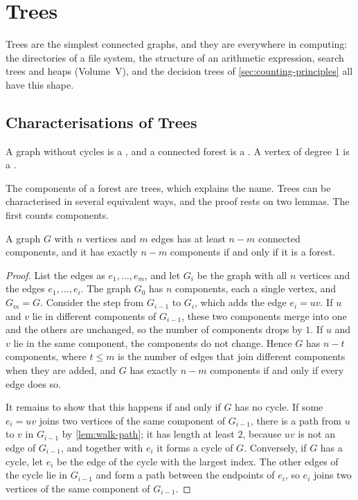 \section{Trees}
\label{sec:trees}

Trees are the simplest connected graphs, and they are everywhere in computing: the directories of a file system, the structure of an arithmetic expression, search trees and heaps (Volume~V), and the decision trees of \cref{sec:counting-principles} all have this shape.

\subsection{Characterisations of Trees}

\begin{definition}
\label{def:tree}
A graph without cycles is a , and a connected forest is a . A vertex of degree $1$ is a .
\end{definition}

The components of a forest are trees, which explains the name. Trees can be characterised in several equivalent ways, and the proof rests on two lemmas. The first counts components.

\begin{lemma}
\label{lem:components-edges}
A graph $G$ with $n$ vertices and $m$ edges has at least $n-m$ connected components, and it has exactly $n-m$ components if and only if it is a forest.
\end{lemma}

\begin{proof}
List the edges as $e_1,\ldots,e_m$, and let $G_i$ be the graph with all $n$ vertices and the edges $e_1,\ldots,e_i$. The graph $G_0$ has $n$ components, each a single vertex, and $G_m=G$. Consider the step from $G_{i-1}$ to $G_i$, which adds the edge $e_i=uv$. If $u$ and $v$ lie in different components of $G_{i-1}$, these two components merge into one and the others are unchanged, so the number of components drops by $1$. If $u$ and $v$ lie in the same component, the components do not change. Hence $G$ has $n-t$ components, where $t\le m$ is the number of edges that join different components when they are added, and $G$ has exactly $n-m$ components if and only if every edge does so.

It remains to show that this happens if and only if $G$ has no cycle. If some $e_i=uv$ joins two vertices of the same component of $G_{i-1}$, there is a path from $u$ to $v$ in $G_{i-1}$ by \cref{lem:walk-path}; it has length at least $2$, because $uv$ is not an edge of $G_{i-1}$, and together with $e_i$ it forms a cycle of $G$. Conversely, if $G$ has a cycle, let $e_i$ be the edge of the cycle with the largest index. The other edges of the cycle lie in $G_{i-1}$ and form a path between the endpoints of $e_i$, so $e_i$ joins two vertices of the same component of $G_{i-1}$.
\end{proof}

